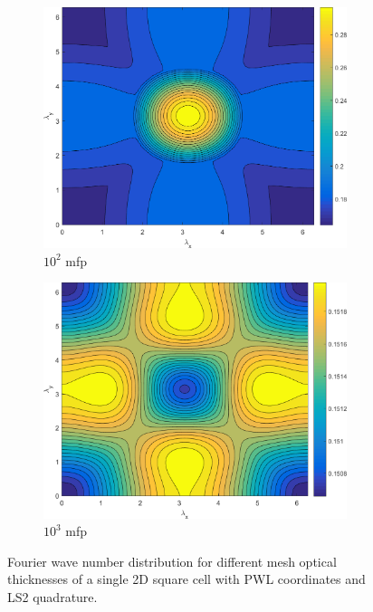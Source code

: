 \begin{figure}
{\begin{subfigure}[b]{0.485\textwidth}
		\centering
		\includegraphics[width=0.975\textwidth]{figures/sec_DSA/SI_MIP_C=4_UPWLD1_LS2_x=100_dydx=1_contour.png}
		\caption{$10^{2}$ mfp}
	\end{subfigure}
	\hfill
	\begin{subfigure}[b]{0.485\textwidth}
		\centering
		\includegraphics[width=0.975\textwidth]{figures/sec_DSA/SI_MIP_C=4_UPWLD1_LS2_x=1000_dydx=1_contour.png}
		\caption{$10^{3}$ mfp}
	\end{subfigure}
	}
\caption{Fourier wave number distribution for different mesh optical thicknesses of a single 2D square cell with PWL coordinates and LS2 quadrature.}
\label{fig::2D_homo_dsa_wave_LS2}
\end{figure}

